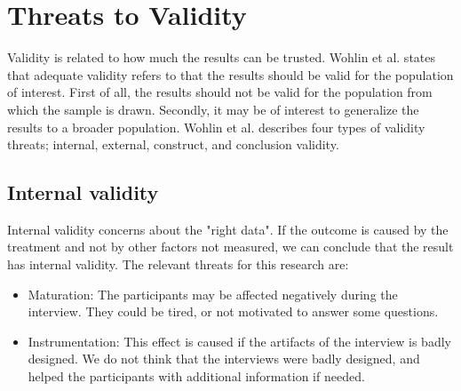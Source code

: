 



\section{Threats to Validity}
\label{sec:threat}
Validity is related to how much the results can be trusted\cite{Wohlin:2000:ESE:330775}. Wohlin et al.\cite{Wohlin:2000:ESE:330775} states that adequate validity refers to that the results should be valid for the population of interest. First of all, the results should not be valid for the population from which the sample is drawn. Secondly, it may be of interest to generalize the results to a broader population. Wohlin et al.\cite{Wohlin:2000:ESE:330775} describes four types of validity threats; internal, external, construct, and conclusion validity.

\subsection{Internal validity}
Internal validity concerns about the "right data"\cite{Wohlin:2000:ESE:330775}. If the outcome is caused by the treatment and not by other factors not measured, we can conclude that the result has internal validity. The relevant threats for this research are:
\begin{itemize}
\item Maturation: The participants may be affected negatively during the interview. They could be tired, or not motivated to answer some questions. 
\item Instrumentation: This effect is caused if the artifacts of the interview is badly designed. We do not think that the interviews were badly designed, and helped the participants with additional information if needed.
\end{itemize}


